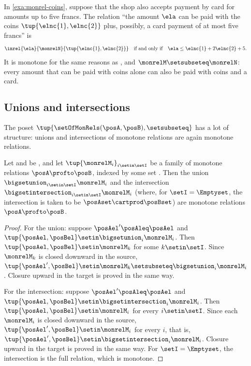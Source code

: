 \begin{example}
    In \cref{exa:monrel-coins}, suppose that the shop also accepts payment by card for amounts up to five francs.
    The relation ``the amount $\ela$ can be paid with the coins $\tup{\elnc{1}, \elnc{2}}$ plus, possibly, a card payment of at most five francs'' is
    \begin{equation}
        \inrel{\ela}{\monrelN}{\tup{\elnc{1}, \elnc{2}}}
        \quad \text{if and only if} \quad
        \ela \leq \elnc{1} + 2\elnc{2} + 5.
    \end{equation}
    It is monotone for the same reasons as \monrelM, and $\monrelM \setsubseteq \monrelN$: every amount that can be paid with coins alone can also be paid with coins and a card.
\end{example}

\subsection{Unions and intersections}

The poset $\tup{\setOfMonRels(\posA, \posB), \setsubseteq}$ has a lot of structure: unions and intersections of monotone relations are again monotone relations.

\begin{lemma}
    \label{lem:monrel-unions-intersections}
    Let \posA and \posB be , and let $\tup{\monrelM_i}_{i \setin \setI}$ be a family of monotone relations $\posA \profto \posB$, indexed by some set \setI.
    Then the union $\bigsetunion_{i \setin \setI} \monrelM_i$ and the intersection $\bigsetintersection_{i \setin \setI} \monrelM_i$ (where, for $\setI = \Emptyset$, the intersection is taken to be $\posAset \cartprod \posBset$) are monotone relations $\posA \profto \posB$.
\end{lemma}
\begin{proof}
    For the union: suppose $\posAel' \posAleq \posAel$ and $\tup{\posAel, \posBel} \setin \bigsetunion_{i} \monrelM_i$.
    Then $\tup{\posAel, \posBel} \setin \monrelM_k$ for some $k \setin \setI$.
    Since $\monrelM_k$ is closed downward in the source, $\tup{\posAel', \posBel} \setin \monrelM_k \setsubseteq \bigsetunion_i \monrelM_i$.
    Closure upward in the target is proved in the same way.

    For the intersection: suppose $\posAel' \posAleq \posAel$ and $\tup{\posAel, \posBel} \setin \bigsetintersection_{i} \monrelM_i$.
    Then $\tup{\posAel, \posBel} \setin \monrelM_i$ for every $i \setin \setI$.
    Since each $\monrelM_i$ is closed downward in the source, $\tup{\posAel', \posBel} \setin \monrelM_i$ for every $i$, that is, $\tup{\posAel', \posBel} \setin \bigsetintersection_i \monrelM_i$.
    Closure upward in the target is proved in the same way.
    For $\setI = \Emptyset$, the intersection is the full relation, which is monotone.
\end{proof}

